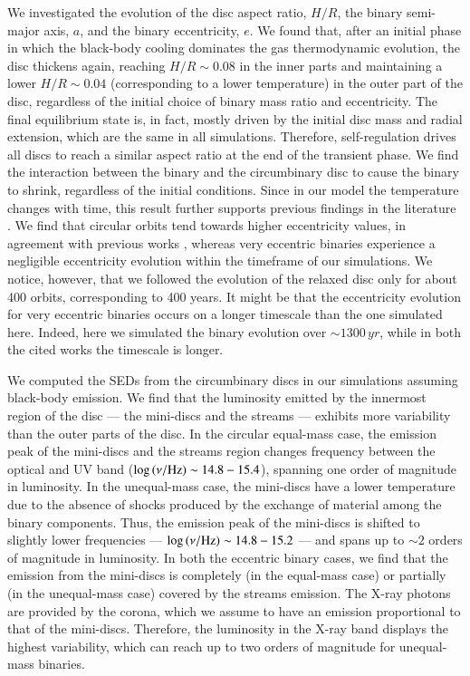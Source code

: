 \documentclass{aa}
\begin{document}
We investigated the evolution of the disc aspect ratio, $H/R$, the binary semi-major axis, $a$, and the binary eccentricity, $e$. We found that, after an initial phase in which the black-body cooling dominates the gas thermodynamic evolution, the disc thickens again, reaching $H/R \sim 0.08$ in the inner parts and maintaining a lower $ H/R \sim 0.04$ (corresponding to a lower temperature) in the outer part of the disc, regardless of the initial choice of binary mass ratio and eccentricity. The final equilibrium state is, in fact, mostly driven by the initial disc mass and radial extension, which are the same in all simulations. 
Therefore, self-regulation \citep{lodato2007sg} drives all discs to reach a similar aspect ratio at the end of the transient phase.
We find the interaction between the binary and the circumbinary disc to cause the binary to shrink, regardless of the initial conditions. Since in our model the temperature changes with time, this result further supports previous findings in the literature \citep{roedig2014,Franchini2021}. 
We find that circular orbits tend towards higher eccentricity values, in agreement with previous works \citep[e.g.][]{DOrazio2021, Siwek2023}, whereas very eccentric binaries experience a negligible eccentricity evolution within the timeframe of our simulations. We notice, however, that we followed the evolution of the relaxed disc only for about 400 orbits, corresponding to 400 years. It might be that the eccentricity evolution for very eccentric binaries occurs on a longer timescale than the one simulated here. Indeed, here we simulated the binary evolution over $\sim 1300 \, yr$, while in both the cited works the timescale is longer.

We computed the SEDs from the circumbinary discs in our simulations assuming black-body emission.
We find that the luminosity emitted by the innermost region of the disc — the mini-discs and the streams — exhibits more variability than the outer parts of the disc.
In the circular equal-mass case, the emission peak of the mini-discs and the streams region changes frequency between the optical and UV band ($\log\,(\nu/\rm{Hz}) \sim 14.8 - 15.4$), spanning one order of magnitude in luminosity. In the unequal-mass case, the mini-discs have a lower temperature due to the absence of shocks produced by the exchange of material among the binary components. Thus, the emission peak of the mini-discs is shifted to slightly lower frequencies — $\log\,(\nu/\rm{Hz}) \sim 14.8-15.2$ — and spans up to $\sim 2 $ orders of magnitude in luminosity. 
In both the eccentric binary cases, we find that the emission from the mini-discs is completely (in the equal-mass case) or partially (in the unequal-mass case) covered by the streams emission. 
The X-ray photons are provided by the corona, which we assume to have an emission proportional to that of the mini-discs. Therefore, the luminosity in the X-ray band displays the highest variability, which can reach up to two orders of magnitude for unequal-mass binaries.
\end{document}
